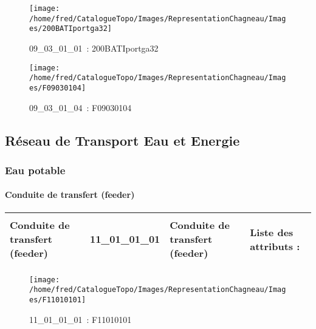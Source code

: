 \documentclass[12pt,titlepage,oneside]{book}
\begin{document}
\begin{figure}[h!]
  \hfill         %
  \begin{minipage}[t]{3cm}
    \begin{center}
      \texttt{[image: /home/fred/CatalogueTopo/Images/RepresentationChagneau/Images/200BATIportga32]}
      \caption[~09\_03\_01\_01]{\small{09\_03\_01\_01~:} \tiny{200BATIportga32}}\label{200BATIportga32}
    \end{center}
  \end{minipage}
  \begin{minipage}[t]{3cm}
    \begin{center}
      \texttt{[image: /home/fred/CatalogueTopo/Images/RepresentationChagneau/Images/F09030104]}
      \caption[~09\_03\_01\_04]{\small{09\_03\_01\_04~:} \tiny{F09030104}}\label{F09030104}
    \end{center}
  \end{minipage}
\end{figure}
\subsection{Réseau de Transport Eau et Energie}
\subsubsection{\large Eau potable}
\paragraph{Conduite de transfert (feeder)}
\noindent
\vspace{\baselineskip}

\renewcommand{\arraystretch}{1.2}
\begin{supertabular}{|p{10cm}|c|p{13cm}|p{12cm}|}
 Conduite de transfert (feeder) & 11\_01\_01\_01 & Conduite de transfert (feeder) & Liste des attributs :
\begin{enumerate}
\end{enumerate}
\\
\hline
\end{supertabular}
\begin{figure}[h!]
  \hfill         %
  \begin{minipage}[t]{3cm}
    \begin{center}
      \texttt{[image: /home/fred/CatalogueTopo/Images/RepresentationChagneau/Images/F11010101]}
      \caption[~11\_01\_01\_01]{\small{11\_01\_01\_01~:} \tiny{F11010101}}\label{F11010101}
    \end{center}
  \end{minipage}
\end{figure}
\end{document}
